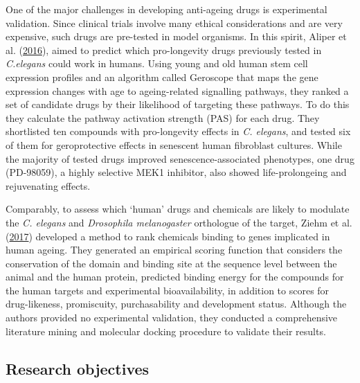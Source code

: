 \documentclass[12pt,twoside]{unicam}
\begin{document}
One of the major challenges in developing anti-ageing drugs is experimental validation. Since clinical trials involve many ethical considerations and are very expensive, such drugs are pre-tested in model organisms. In this spirit, Aliper et al. (\protect\hyperlink{ref-Aliper2016}{2016}), aimed to predict which pro-longevity drugs previously tested in \emph{C.elegans} could work in humans. Using young and old human stem cell expression profiles and an algorithm called Geroscope that maps the gene expression changes with age to ageing-related signalling pathways, they ranked a set of candidate drugs by their likelihood of targeting these pathways. To do this they calculate the pathway activation strength (PAS) for each drug. They shortlisted ten compounds with pro-longevity effects in \emph{C. elegans}, and tested six of them for geroprotective effects in senescent human fibroblast cultures. While the majority of tested drugs improved senescence-associated phenotypes, one drug (PD-98059), a highly selective MEK1 inhibitor, also showed life-prolongeing and rejuvenating effects.

Comparably, to assess which `human' drugs and chemicals are likely to modulate the \emph{C. elegans} and \emph{Drosophila melanogaster} orthologue of the target, Ziehm et al. (\protect\hyperlink{ref-Ziehm2017}{2017}) developed a method to rank chemicals binding to genes implicated in human ageing. They generated an empirical scoring function that considers the conservation of the domain and binding site at the sequence level between the animal and the human protein, predicted binding energy for the compounds for the human targets and experimental bioavailability, in addition to scores for drug-likeness, promiscuity, purchasability and development status. Although the authors provided no experimental validation, they conducted a comprehensive literature mining and molecular docking procedure to validate their results.

\hypertarget{research-objectives-2}{%
\subsection{Research objectives}\label{research-objectives-2}}
\end{document}

